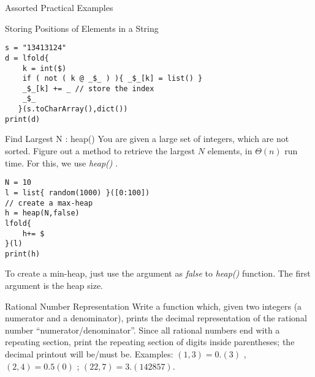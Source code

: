 \begin{section}{Assorted Practical Examples}
\begin{subsection}{Storing Positions of Elements in a String}
\begin{center}\begin{minipage}{\linewidth}
\begin{lstlisting}[style=JexlStyle]
s = "13413124"
d = lfold{
    k = int($)
    if ( not ( k @ _$_ ) ){ _$_[k] = list() }
    _$_[k] += _ // store the index 
    _$_ 
   }(s.toCharArray(),dict())
print(d)
\end{lstlisting}  
\end{minipage}\end{center}

\end{subsection}


\begin{subsection}{Find Largest N : heap() }
You are given a large set of integers, which are not sorted. 
Figure out a method to retrieve the largest $N$ elements, in $\Theta(n)$ run time.
For this, we use \emph{heap()} .

\begin{center}\begin{minipage}{\linewidth}
\begin{lstlisting}[style=JexlStyle]
N = 10 
l = list{ random(1000) }([0:100])
// create a max-heap
h = heap(N,false)
lfold{
    h+= $
}(l)
print(h)
\end{lstlisting}  
\end{minipage}\end{center}
To create a min-heap, just use the argument as \emph{false} to \emph{heap()} function.
The first argument is the heap size.
\end{subsection}


\begin{subsection}{Rational Number Representation}
Write a function which, given two integers (a numerator and a denominator), 
prints the decimal representation of the rational number ``numerator/denominator''. 
Since all rational numbers end with a repeating section, print the repeating section of digits inside parentheses; 
the decimal printout will be/must be. 
Examples: $(1 , 3) = 0.(3)$  , $(2 , 4) = 0.5(0)$ ; $(22, 7) = 3.(142857)$. 


\end{subsection}
\end{section}
